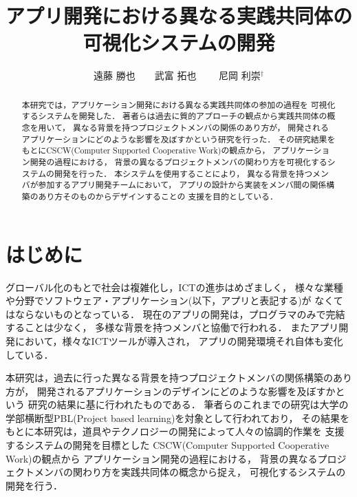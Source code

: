 \documentclass[twoside]{wiss}
\begin{document}
\title{アプリ開発における異なる実践共同体の可視化システムの開発}
\etitle{}%
%
%
%
\author{遠藤 勝也　　武富 拓也
　　尼岡 利崇${}^\dag$}

\begin{abstract}
本研究では，アプリケーション開発における異なる実践共同体の参加の過程を
可視化するシステムを開発した．
著者らは過去に質的アプローチの観点から実践共同体の概念を用いて，
異なる背景を持つプロジェクトメンバの関係のあり方が，
開発されるアプリケーションにどのような影響を及ぼすかという研究を行った．
その研究結果をもとにCSCW(Computer Supported Cooperative Work)の観点から，
アプリケーション開発の過程における，
背景の異なるプロジェクトメンバの関わり方を可視化するシステムの開発を行った．
本システムを使用することにより，
異なる背景を持つメンバが参加するアプリ開発チームにおいて，
アプリの設計から実装をメンバ間の関係構築のあり方そのものからデザインすることの
支援を目的としている．
\end{abstract}

\maketitle

\section{はじめに}

グローバル化のもとで社会は複雑化し，ICTの進歩はめざましく，
様々な業種や分野でソフトウェア・アプリケーション(以下，アプリと表記する)が
なくてはならないものとなっている．
現在のアプリの開発は，プログラマのみで完結することは少なく，
多様な背景を持つメンバと協働で行われる．
またアプリ開発において，様々なICTツールが導入され，
アプリの開発環境それ自体も変化している．


本研究は，過去に行った異なる背景を持つプロジェクトメンバの関係構築のあり方が，
開発されるアプリケーションのデザインにどのような影響を及ぼすかという
研究\cite{preStudy}の結果に基に行われたものである．
筆者らのこれまでの研究は大学の学部横断型PBL(Project based learning)を対象として行われており，
その結果をもとに本研究は，道具やテクノロジーの開発によって人々の協調的作業を
支援するシステムの開発を目標とした
CSCW(Computer Supported Cooperative Work)\cite{cscwDefin}の観点から
アプリケーション開発の過程における，
背景の異なるプロジェクトメンバの関わり方を実践共同体の概念から捉え，
可視化するシステムの開発を行う．
\end{document}
